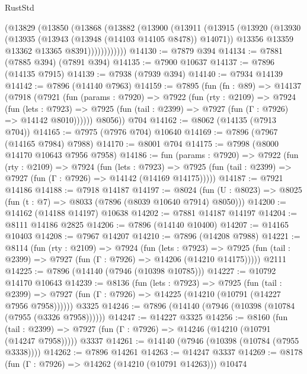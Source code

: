 \begin{lexlean}{RustStd}
\begin{coremodule}
          (@13829
            (@13850
              (@13868
                (@13882
                  (@13900
                    (@13911
                      (@13915
                        (@13920
                          (@13930
                            (@13935 (@13943 (@13948 (@14103 @14105 @8478)) @14071))
                            @13356
                            @13359
                            @13362
                            @13365
                            @8391))))))))))))
@14130 := @7879 @394
@14134 := @7881 (@7885 @394) (@7891 @394)
@14135 := @7900 @10637
@14137 := @7896 (@14135 @7915)
@14139 := @7938 (@7939 @394)
@14140 := @7934 @14139
@14142 := @7896 (@14140 @7963)
@14159 := @7895
    (fun (fn : @89) =>
    @14137
      (@7918
        (@7921
          (fun (params : @7920) =>
          @7922
            (fun (rty : @2109) =>
            @7924
              (fun (lets : @7923) =>
              @7925 (fun (tail : @2399) => @7927 (fun (Γ : @7926) => @14142 @8010))))))
        @8056))
    @704
@14162 := @8062 (@14135 (@7913 @704))
@14165 := @7975 (@7976 @704) @10640
@14169 := @7896 (@7967 (@14165 @7984) @7988)
@14170 := @8001 @704
@14175 := @7998 (@8000 @14170 @10643 @7956 @7958)
@14186 := fun (params : @7920) =>
  @7922
    (fun (rty : @2109) =>
    @7924
      (fun (lets : @7923) =>
      @7925 (fun (tail : @2399) => @7927 (fun (Γ : @7926) => @14142 (@14169 @14175)))))
@14187 := @7921 @14186
@14188 := @7918 @14187
@14197 := @8024
    (fun (U : @8023) => @8025 (fun (t : @7) => @8033 (@7896 (@8039 @10640 @7914) @8050)))
@14200 := @14162 (@14188 @14197) @10638
@14202 := @7881 @14187 @14197
@14204 := @8111 @14186 @2825
@14206 := @7896 (@14140 @10400)
@14207 := @14165 @10403
@14208 := @7967 @14207
@14210 := @7896 (@14208 @7988)
@14221 := @8114
    (fun (rty : @2109) =>
    @7924
      (fun (lets : @7923) =>
      @7925 (fun (tail : @2399) => @7927 (fun (Γ : @7926) => @14206 (@14210 @14175)))))
    @2111
@14225 := @7896 (@14140 (@7946 (@10398 @10785)))
@14227 := @10792 @14170 @10643
@14239 := @8136
    (fun (lets : @7923) =>
    @7925
      (fun (tail : @2399) =>
      @7927 (fun (Γ : @7926) => @14225 (@14210 (@10791 (@14227 @7956 @7958))))))
    @3325
@14246 := @7896 (@14140 (@7946 (@10398 (@10784 (@7955 (@3326 @7958))))))
@14247 := @14227 @3325
@14256 := @8160
    (fun (tail : @2399) => @7927 (fun (Γ : @7926) => @14246 (@14210 (@10791 (@14247 @7958)))))
    @3337
@14261 := @14140 (@7946 (@10398 (@10784 (@7955 @3338))))
@14262 := @7896 @14261
@14263 := @14247 @3337
@14269 := @8178 (fun (Γ : @7926) => @14262 (@14210 (@10791 @14263))) @10474

\end{coremodule}
\end{lexlean}
